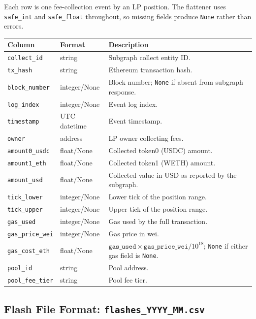 \documentclass[11pt,a4paper]{article}
\begin{document}
Each row is one fee-collection event by an LP position. The flattener uses
\texttt{safe\_int} and \texttt{safe\_float} throughout, so missing fields
produce \texttt{None} rather than errors.

\begin{xltabular}{\linewidth}{L{4.5cm}L{3.0cm}Y}
\toprule
\textbf{Column} & \textbf{Format} & \textbf{Description} \\
\midrule
\texttt{collect\_id} & string & Subgraph collect entity ID. \\
\texttt{tx\_hash} & string & Ethereum transaction hash. \\
\texttt{block\_number} & integer/None & Block number; \texttt{None} if
  absent from subgraph response. \\
\texttt{log\_index} & integer/None & Event log index. \\
\texttt{timestamp} & UTC datetime & Event timestamp. \\
\texttt{owner} & address & LP owner collecting fees. \\
\texttt{amount0\_usdc} & float/None & Collected token0 (USDC) amount. \\
\texttt{amount1\_eth} & float/None & Collected token1 (WETH) amount. \\
\texttt{amount\_usd} & float/None & Collected value in USD as reported
  by the subgraph. \\
\texttt{tick\_lower} & integer/None & Lower tick of the position range. \\
\texttt{tick\_upper} & integer/None & Upper tick of the position range. \\
\texttt{gas\_used} & integer/None & Gas used by the full transaction. \\
\texttt{gas\_price\_wei} & integer/None & Gas price in wei. \\
\texttt{gas\_cost\_eth} & float/None & $\texttt{gas\_used} \times
  \texttt{gas\_price\_wei} / 10^{18}$; \texttt{None} if either gas
  field is \texttt{None}. \\
\texttt{pool\_id} & string & Pool address. \\
\texttt{pool\_fee\_tier} & string & Pool fee tier. \\
\bottomrule
\end{xltabular}

\subsection{Flash File Format: \texttt{flashes\_YYYY\_MM.csv}}
\end{document}
